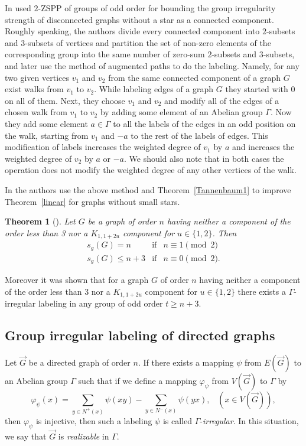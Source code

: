 \documentclass{article}
\newtheorem{thm}{Theorem}[section]
\begin{document}
In \cite{ref_AnhCic} used $2$-ZSPP of groups of odd order for bounding the group irregularity strength of disconnected graphs without a star as a connected component. Roughly speaking, the authors divide every connected component into $2$-subsets and $3$-subsets of vertices and partition the set of non-zero elements of the corresponding group into the same number of zero-sum $2$-subsets and $3$-subsets, and later use the method of augmented paths to do the labeling.
Namely, for any two given vertices $v_1$ and $v_2$ from the same connected component of a graph $G$ exist walks from $v_1$ to $v_2$. While labeling edges of a graph $G$ they started with $0$ on all of them.
Next, they choose $v_1$ and $v_2$ and modify all of the edges of a chosen walk from  $v_1$ to $v_2$ by adding some element of an Abelian group $\Gamma$.
Now they add some element $a\in \Gamma$ to all the labels of the edges in an odd position on the walk, starting from $v_1$ and $-a$ to the rest of the labels of edges. 
This modification of labels increases the weighted degree of $v_1$ by $a$ and increases the weighted degree of $v_2$ by $a$ or $-a$. We should also note that in both cases the operation does not modify the weighted degree of any other vertices of the walk.

In \cite{CicKrup} the authors use the above method and Theorem~\ref{Tannenbaum1} to improve Theorem~\ref{linear} for graphs without small stars.
\begin{thm}[\cite{CicKrup}]\label{bez_K13}
    Let $G$ be a graph of order $n$ having neither a component of the order less than 3 nor a $K_{1,1+2u}$  component for $u\in\{1,2\}$.
    Then
     $$\begin{matrix}
       s_g(G) = n & \text{if} & n\equiv 1 \pmod2\\ 
       s_g(G) \leq n+3 & \text{if} & n\equiv 0 \pmod2.
    \end{matrix}$$
\end{thm}

Moreover it was shown that for a graph $G$  of order $n$ having neither a component of the order less than 3 nor a $K_{1,1+2u}$  component for $u\in\{1,2\}$ there exists a $\Gamma$-irregular labeling in any group of odd order $t\geq n+3$.

\subsection{Group irregular labeling of directed graphs}
Let  $\overrightarrow{G}$  be a directed  graph of order $n$. If  there exists a
 mapping $\psi$ from  $E(\overrightarrow{G})$  to an Abelian group $\Gamma$
such
that if we define a mapping $\varphi_{\psi}$ from $V(\overrightarrow{G})$ 
to $\Gamma$
by
$$\varphi_{\psi}(x)=\sum_{y\in N^+(x)}\psi(xy)-\sum_{y\in N^-(x)}\psi(yx),\;\;\;(x\in V(\overrightarrow{G})),$$
then $\varphi_{\psi}$
is injective, then such a labeling $\psi$ is called $\Gamma$-\textit{irregular}. In this situation, we say that $\overrightarrow{G}$ is \textit{realizable} in
$\Gamma$.
\end{document}
